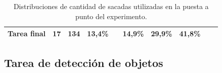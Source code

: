 \documentclass[compress]{beamer}
\begin{document}
\begin{frame}
\begin{table}[h]
\begin{tabular}{c|c|c|c|c|c|c|c|c|c|}
\multicolumn{1}{|c|}{\textbf{Tarea final}} & 17                                                                                       & 134                                                                                                  & 13,4\%    &            & 14,9\%    & 29,9\%    & 41,8\%     &             &             \\ \hline
\end{tabular}
\caption{\label{tab:tareas} Distribuciones de cantidad de sacadas utilizadas en la puesta a punto del experimento.}
\end{table}


\end{frame}

\subsection{Tarea de detección de objetos}
\end{document}
